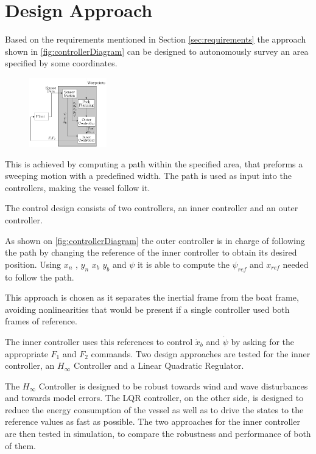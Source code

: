 \chapter{Design Approach} \label{chap:designaproach}
Based on the requirements mentioned in Section \ref{sec:requirements} the approach shown in \autoref{fig:controllerDiagram} can be designed to autonomously survey an area specified by some coordinates.
\begin{figure}[H]
    \includegraphics[width=0.3\textwidth]{figures/controllerDiagram2}
    \caption{}
    \label{fig:controllerDiagram}
\end{figure}
This is achieved by computing a path within the specified area, that preforms a sweeping motion with a predefined width. The path is used as input into the controllers, making the vessel follow it. 

The control design consists of two controllers, an inner controller and an outer controller. 

As shown on \autoref{fig:controllerDiagram} the outer controller is in charge of following the path by changing the reference of the inner controller to obtain its desired position. Using $x_{n}$ , $y_{n}$ $x_b$ $y_b$ and $\psi$ it is able to compute the $\psi_{ref}$ and $x_{ref}$ needed to follow the path. 

This approach is chosen as it separates the inertial frame from the boat frame, avoiding nonlinearities that would be present if a single controller used both frames of reference. 

The inner controller uses this references to control $\dot{x}_{b}$ and $\dot{\psi}$ by asking for the appropriate $F_{1}$ and $F_{2}$ commands. Two design approaches are tested for the inner controller, an $H_{\infty}$ Controller and a Linear Quadratic Regulator.

The $H_{\infty}$ Controller is designed to be robust towards wind and wave disturbances and towards model errors. The LQR controller, on the other side, is designed to reduce the energy consumption of the vessel as well as to drive the states to the reference values as fast as possible. 
The two approaches for the inner controller are then tested in simulation, to compare the robustness and performance of both of them. 

